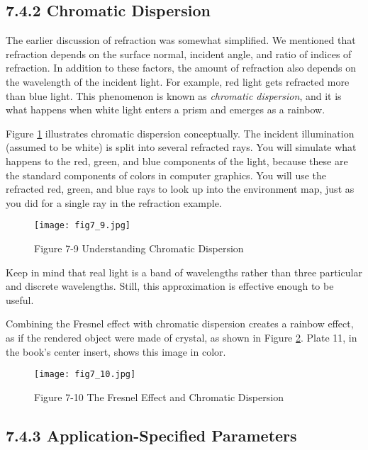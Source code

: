 \documentclass[../main.tex]{subfiles}
\begin{document}
\subsection{7.4.2 Chromatic Dispersion}

The earlier discussion of refraction was somewhat simplified. We mentioned that refraction depends on the surface normal, incident angle, and ratio of indices of refraction. In addition to these factors, the amount of refraction also depends on the wavelength of the incident light. For example, red light gets refracted more than blue light. This phenomenon is known as \textit{chromatic dispersion}, and it is what happens when white light enters a prism and emerges as a rainbow.

Figure \ref{fig:7-9} illustrates chromatic dispersion conceptually. The incident illumination (assumed to be white) is split into several refracted rays. You will simulate what happens to the red, green, and blue components of the light, because these are the standard components of colors in computer graphics. You will use the refracted red, green, and blue rays to look up into the environment map, just as you did for a single ray in the refraction example.

\begin{figure}
    \centering
    \texttt{[image: fig7\_9.jpg]}
    \caption{Figure 7-9 Understanding Chromatic Dispersion}
    \label{fig:7-9}
\end{figure}

Keep in mind that real light is a band of wavelengths rather than three particular and discrete wavelengths. Still, this approximation is effective enough to be useful.

Combining the Fresnel effect with chromatic dispersion creates a rainbow effect, as if the rendered object were made of crystal, as shown in Figure \ref{fig:7-10}. Plate 11, in the book's center insert, shows this image in color.

\begin{figure}
    \centering
    \texttt{[image: fig7\_10.jpg]}
    \caption{Figure 7-10 The Fresnel Effect and Chromatic Dispersion}
    \label{fig:7-10}
\end{figure}

\subsection{7.4.3 Application-Specified Parameters}
\end{document}
